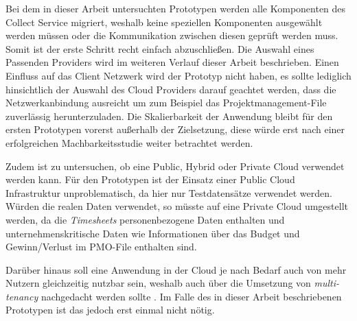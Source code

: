 
Bei dem in dieser Arbeit untersuchten Prototypen werden alle Komponenten des Collect Service migriert, weshalb keine speziellen Komponenten ausgewählt werden müssen oder die Kommunikation zwischen diesen geprüft werden muss. Somit ist der erste Schritt recht einfach abzuschließen. Die Auswahl eines Passenden Providers wird im weiteren Verlauf dieser Arbeit beschrieben. Einen Einfluss auf das Client Netzwerk wird der Prototyp nicht haben, es sollte lediglich hinsichtlich der Auswahl des Cloud Providers darauf geachtet werden, dass die Netzwerkanbindung ausreicht um zum Beispiel das Projektmanagement-File zuverlässig herunterzuladen. Die Skalierbarkeit der Anwendung bleibt für den ersten Prototypen vorerst außerhalb der Zielsetzung, diese würde erst nach einer erfolgreichen Machbarkeitsstudie weiter betrachtet werden.

Zudem ist zu untersuchen, ob eine Public, Hybrid oder Private Cloud verwendet werden kann. Für den Prototypen ist der Einsatz einer Public Cloud Infrastruktur unproblematisch, da hier nur Testdatensätze verwendet werden. Würden die realen Daten verwendet, so müsste auf eine Private Cloud umgestellt werden, da die \textit{\glspl{Timesheet}} personenbezogene Daten enthalten und unternehmenskritische Daten wie Informationen über das Budget und Gewinn/Verlust im PMO-File enthalten sind.

Darüber hinaus soll eine Anwendung in der Cloud je nach Bedarf auch von mehr Nutzern gleichzeitig nutzbar sein, weshalb auch über die Umsetzung von \textit{multi-tenancy} nachgedacht werden sollte \cite[Vgl.][S. 34ff]{Maenhaut2016}. Im Falle des in dieser Arbeit beschriebenen Prototypen ist das jedoch erst einmal nicht nötig.
\pagebreak